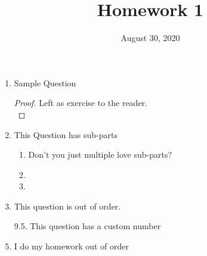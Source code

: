 \documentclass[../main.tex]{subfiles}
\title{Homework 1}
\date{August 30, 2020}
\begin{document}
\maketitle

\begin{enumerate}

    \item Sample Question
        \begin{proof} 
            Left as exercise to the reader. \\
        \end{proof} 
    
    \item This Question has sub-parts
        \begin{enumerate}
            \item Don't you just multiple love sub-parts?
            \item 
            \item 
        \end{enumerate}
    
    \item This question is out of order. 
    
    \item [9.5.] This question has a custom number
    
    \item I do my homework out of order


\end{enumerate}
\end{document}
